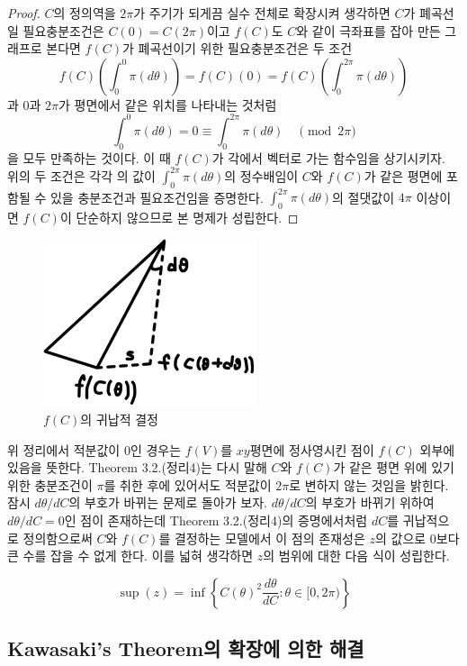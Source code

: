 \documentclass[11pt]{article}
\begin{document}
\begin{proof}
$C$의 정의역을 $2\pi$가 주기가 되게끔 실수 전체로 확장시켜 생각하면 $C$가 폐곡선일 필요충분조건은 $C(0)=C(2\pi)$이고 $f(C)$도 $C$와 같이 극좌표를 잡아 만든 그래프로 본다면 $f(C)$가 폐곡선이기 위한 필요충분조건은 두 조건
$$f(C)\left(\int_0^0 \pi(d\theta) \right)=f(C)(0)=f(C)\left(\int_0^{2\pi} \pi(d \theta)\right)$$
과 0과 $2\pi$가 평면에서 같은 위치를 나타내는 것처럼
$$\int_0^0 \pi(d\theta) =0 \equiv \int_0^{2\pi} \pi(d\theta) \quad \pmod {2\pi}$$
을 모두 만족하는 것이다. 이 때 $f(C)$가 각에서 벡터로 가는 함수임을 상기시키자. 위의 두 조건은 각각 의 값이 $\int_0^{2\pi} \pi(d\theta)$의 정수배임이 $C$와 $f(C)$가 같은 평면에 포함될 수 있을 충분조건과 필요조건임을 증명한다.
$\int_0^{2\pi} \pi(d\theta)$의 절댓값이 $4\pi$ 이상이면 $f(C)$이 단순하지 않으므로 본 명제가 성립한다.
\end{proof}


\begin{figure}
\centering
\includegraphics{8.png}
\caption{$f(C)$의 귀납적 결정}
\end{figure}


위 정리에서 적분값이 0인 경우는 $f(V)$를 $xy$평면에 정사영시킨 점이 $f(C)$ 외부에 있음을 뜻한다. Theorem 3.2.(정리4)는 다시 말해 $C$와 $f(C)$가 같은 평면 위에 있기 위한 충분조건이 $\pi$를 취한 후에 있어서도 적분값이 $2\pi$로 변하지 않는 것임을 밝힌다.
잠시 $d\theta/dC$의 부호가 바뀌는 문제로 돌아가 보자. $d\theta/dC$의 부호가 바뀌기 위하여 $d\theta/dC=0$인 점이 존재하는데 Theorem 3.2.(정리4)의 증명에서처럼 $dC$를 귀납적으로 정의함으로써 $C$와 $f(C)$를 결정하는 모델에서 이 점의 존재성은 $z$의 값으로 0보다 큰 수를 잡을 수 없게 한다. 이를 넓혀 생각하면 $z$의 범위에 대한 다음 식이 성립한다.


\begin{equation}
\sup(z)=\inf \left\{ C(\theta)^2 \frac{d\theta}{dC} : \theta \in [0,2\pi) \right\} \nonumber
\end{equation}




\subsection{Kawasaki's Theorem의 확장에 의한 해결}
\end{document}
